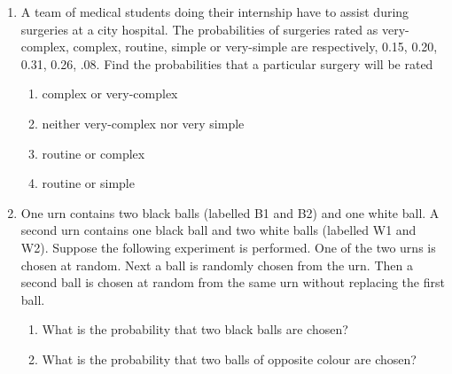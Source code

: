\begin{enumerate}[label=\thesection.\arabic*,ref=\thesection.\theenumi]
	\item A team of medical students doing their internship have to assist during surgeries
at a city hospital. The probabilities of surgeries rated as very-complex, complex,
routine, simple or very-simple are respectively, 0.15, 0.20, 0.31, 0.26, .08. Find
the probabilities that a particular surgery will be rated
\begin{enumerate}
\item complex or very-complex
\item neither very-complex nor very simple
\item routine or complex
\item routine or simple
\end{enumerate}
		\solution
	\item One urn contains two black balls (labelled B1 and B2) and one white ball. A
	second urn contains one black ball and two white balls (labelled W1 and W2).
	Suppose the following experiment is performed. One of the two urns is chosen
	at random. Next a ball is randomly chosen from the urn. Then a second ball is
	chosen at random from the same urn without replacing the first ball.
	
	\begin{enumerate}
	\item What is the probability that two black balls are chosen?
	
	\item What is the probability that two balls of opposite colour are chosen?
	\end{enumerate}
	\solution
  

\end{enumerate}
